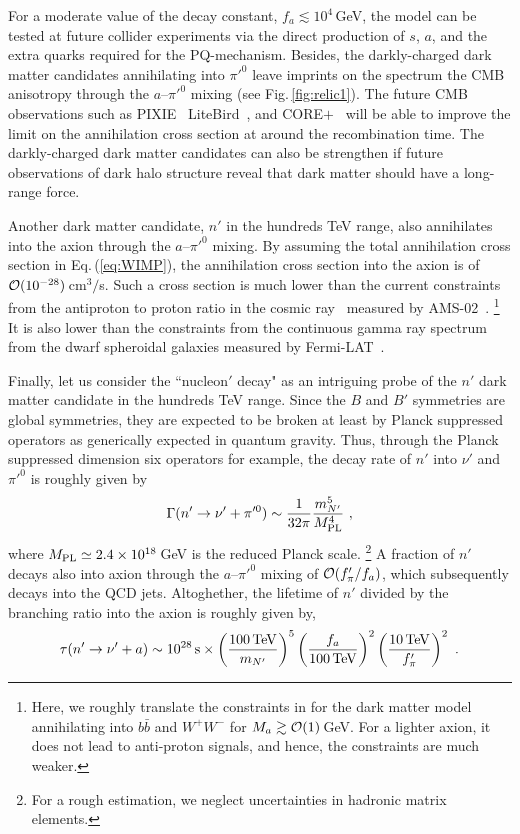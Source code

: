 \documentclass[aps,amsmath,preprint,epsf,superscriptaddress,nofootinbib,notitlepage]{revtex4-1}
\begin{document}
For a moderate value of the decay constant, $f_a \lesssim 10^4$\,GeV, the model can be tested at future collider experiments via 
the direct production of $s$, $a$, and the extra quarks required for the PQ-mechanism.
Besides, the darkly-charged dark matter candidates annihilating into $\pi'^0$ leave imprints on the spectrum the CMB anisotropy
through the $a$--$\pi'^0$ mixing (see Fig.\,\ref{fig:relic1}).
The future CMB observations such as {PIXIE}~\cite{Kogut:2011xw}
{LiteBird}~\cite{Matsumura:2013aja}, and {CORE$+$}~\cite{Martins:2015dtz} will be able to improve the limit on the annihilation 
cross section at around the recombination time.
The darkly-charged dark matter candidates can also be strengthen if future observations of dark halo structure reveal 
that dark matter should have a long-range force.

Another dark matter candidate, $n'$ in the hundreds TeV range, also annihilates into the axion through  the $a$--$\pi'^0$ mixing.
By assuming the total annihilation cross section in Eq.\,(\ref{eq:WIMP}),
the annihilation cross section into the axion is of ${\cal O}(10^{-28})$\,cm$^3/$s. 
Such a cross section  is much lower than the current 
constraints from the antiproton to proton ratio in the cosmic ray~\cite{Giesen:2015ufa,Ibe:2015tma} measured
by AMS-02~\cite{AMS02:2015}.%
\footnote{Here, we roughly translate the constraints in \cite{Giesen:2015ufa,Ibe:2015tma} 
for the dark matter model annihilating into $b\bar{b}$ and $W^+W^-$ for $M_a \gtrsim {\cal O}(1)$\,GeV.
For a lighter axion, it does not lead to anti-proton signals, and hence, the constraints are much weaker.}
It is also lower than the constraints from the continuous gamma ray spectrum from the dwarf spheroidal galaxies
measured by Fermi-LAT~\cite{Ackermann:2015zua}.

Finally, let us consider  the ``nucleon$'$ decay"
as an intriguing probe of the $n'$ dark matter candidate in the hundreds TeV range. 
Since the $B$ and $B'$ symmetries are global symmetries, they are expected to be broken at least
by Planck suppressed operators as generically expected  in quantum gravity.
Thus, through the Planck suppressed dimension six operators for example, 
the decay rate of $n'$ into $\nu'$ and $\pi'^0$ is roughly given by
\begin{eqnarray}
\Gamma(n' \to \nu' + \pi'^0) \sim \frac{1}{32\pi} \frac{m_{N'}^5}{M_{\rm PL}^4} \ ,
\end{eqnarray}
where $M_{\rm PL} \simeq 2.4 \times 10^{18}$\,GeV is the reduced Planck scale.%
\footnote{For a rough estimation, we neglect uncertainties in hadronic matrix elements.}
A fraction of  $n'$ decays also into axion through the $a$--$\pi'^0$ mixing of ${\cal O}(f_\pi'/f_a)$,
which subsequently decays into the QCD jets.
Altoghether, the lifetime of $n'$ divided by the branching ratio into the axion is roughly given by,
\begin{eqnarray}
\label{eq:nprime}
\tau(n' \to \nu' + a) \sim 10^{28}\,{\rm s}\times \left(\frac{100\,{\rm TeV}}{m_{N'}}\right)^5
\left(\frac{f_a}{100\,\rm TeV}\right)^2
\left(\frac{10\,\rm TeV}{f_\pi'}\right)^2\ .
\end{eqnarray}
\end{document}
